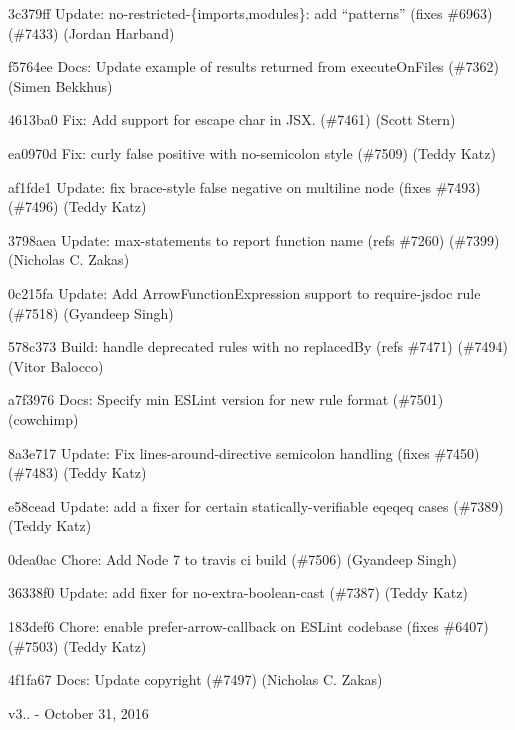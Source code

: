 \begin{DoxyItemize}
\item 3c379ff Update\+: {\ttfamily no-\/restricted-\/\{imports,modules\}}\+: add “patterns” (fixes \#6963) (\#7433) (Jordan Harband)
\item f5764ee Docs\+: Update example of results returned from {\ttfamily execute\+On\+Files} (\#7362) (Simen Bekkhus)
\item 4613ba0 Fix\+: Add support for escape char in J\+SX. (\#7461) (Scott Stern)
\item ea0970d Fix\+: {\ttfamily curly} false positive with no-\/semicolon style (\#7509) (Teddy Katz)
\item af1fde1 Update\+: fix {\ttfamily brace-\/style} false negative on multiline node (fixes \#7493) (\#7496) (Teddy Katz)
\item 3798aea Update\+: max-\/statements to report function name (refs \#7260) (\#7399) (Nicholas C. Zakas)
\item 0c215fa Update\+: Add {\ttfamily Arrow\+Function\+Expression} support to {\ttfamily require-\/jsdoc} rule (\#7518) (Gyandeep Singh)
\item 578c373 Build\+: handle deprecated rules with no \textquotesingle{}replaced\+By\textquotesingle{} (refs \#7471) (\#7494) (Vitor Balocco)
\item a7f3976 Docs\+: Specify min E\+S\+Lint version for new rule format (\#7501) (cowchimp)
\item 8a3e717 Update\+: Fix {\ttfamily lines-\/around-\/directive} semicolon handling (fixes \#7450) (\#7483) (Teddy Katz)
\item e58cead Update\+: add a fixer for certain statically-\/verifiable {\ttfamily eqeqeq} cases (\#7389) (Teddy Katz)
\item 0dea0ac Chore\+: Add Node 7 to travis ci build (\#7506) (Gyandeep Singh)
\item 36338f0 Update\+: add fixer for {\ttfamily no-\/extra-\/boolean-\/cast} (\#7387) (Teddy Katz)
\item 183def6 Chore\+: enable {\ttfamily prefer-\/arrow-\/callback} on E\+S\+Lint codebase (fixes \#6407) (\#7503) (Teddy Katz)
\item 4f1fa67 Docs\+: Update copyright (\#7497) (Nicholas C. Zakas)
\end{DoxyItemize}

v3.. -\/ October 31, 2016


